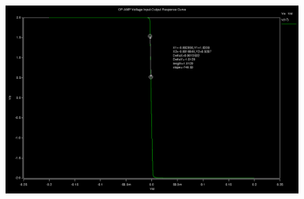 \documentclass[12pt]{article}
\begin{document}
\FloatBarrier
\begin{figure}[h!]
\begin{center}
 \includegraphics[scale=0.3]{./v-v.png}
\end{center}
\end{figure}
\FloatBarrier
\end{document}
